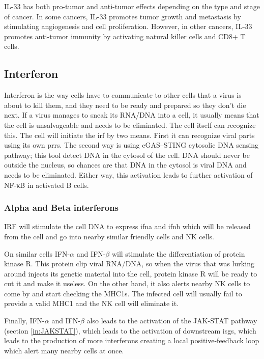 IL-33 has both pro-tumor and anti-tumor effects depending on the type and stage of cancer. In some cancers, IL-33 promotes tumor growth and metastasis by stimulating angiogenesis and cell proliferation. However, in other cancers, IL-33 promotes anti-tumor immunity by activating natural killer cells and CD8+ T cells.

\subsection{Interferon}
\label{in:inter}

Interferon is the way cells have to communicate to other cells that a virus is about to kill them, and they need to be ready and prepared so they don't die next. If a virus manages to sneak its RNA/DNA into a cell, it usually means that the cell is unsalvageable and needs to be eliminated. The cell itself can recognize this. The cell will initiate the \gls{irf} by two means. First it can recognize viral parts using its own \gls{prrs}. The second way is using cGAS–STING cytosolic DNA sensing pathway; this tool detect DNA in the cytosol of the cell. DNA should never be outside the nucleus, so chances are that DNA in the cytosol is viral DNA and needs to be eliminated. Either way, this activation leads to further activation of NF-κB in activated B cells.

\subsubsection{Alpha and Beta interferons}

IRF will stimulate the cell DNA to express \gls{ifna} and \gls{ifnb} which will be released from the cell and go into nearby similar friendly cells and NK cells.

On similar cells IFN-$\alpha$ and IFN-$\beta$ will stimulate the differentiation of protein kinase R. This protein clip viral RNA/DNA, so when the virus that was lurking around injects its genetic material into the cell, protein kinase R will be ready to cut it and make it useless. On the other hand, it also alerts nearby NK cells to come by and start checking the MHC1s. The infected cell will usually fail to provide a valid MHC1 and the NK cell will eliminate it.

Finally, IFN-$\alpha$ and IFN-$\beta$ also leads to the activation of the JAK-STAT pathway (section \ref{in:JAKSTAT}), which leads to the activation of downstream \gls{isgs}, which leads to the production of more interferons creating a local positive-feedback loop which alert many nearby cells at once.

